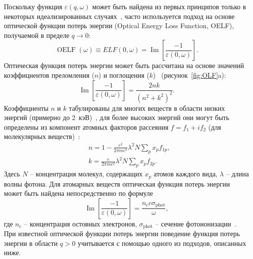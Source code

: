 Поскольку функция $\varepsilon(q, \omega)$ может быть найдена из первых принципов только в некоторых идеализированных случаях~\cite{Ritchie_ELF}, часто используется подход на основе оптической функции потерь энергии (Optical Energy Loss Function, OELF), получаемой в пределе $q \rightarrow 0$:
\begin{equation}
	\operatorname{OELF}(\omega) \equiv E L F(0, \omega)=\operatorname{Im}\left[\frac{-1}{\varepsilon(0, \omega)}\right].
\end{equation}
Оптическая функция потерь энергии может быть рассчитана на основе значений коэффициентов преломления ($n$) и поглощения ($k$)~\cite{Dapor_2015_oscillators} (рисунок~\ref{fig:OLF}a):
\begin{equation}
	\operatorname{Im}\left[\frac{-1}{\varepsilon(0, \omega)}\right]=\frac{2 n k}{\left(n^2+k^2\right)^2}.
\end{equation}
Коэффициенты $n$ и $k$ табулированы для многих веществ в области низких энергий (примерно до 2~кэВ)~\cite{Palik}, для более высоких энергий они могут быть определены из компонент атомных факторов рассеяния $f = f_1 + i f_2$ (для молекулярных веществ)~\cite{Henke_photoabs}:
\begin{equation}
	\begin{aligned}
		&n=1-\frac{e^2}{2 \pi m c^2} \lambda^2 N \sum_p x_p f_{1 p}, \\
		&k=\frac{e}{2 \pi m c^2} \lambda^2 N \sum_p x_p f_{2 p}.
	\end{aligned}
\end{equation}
Здесь $N$ -- концентрация молекул, содержащих $x_p$ атомов каждого вида, $\lambda$ -- длина волны фотона. Для атомарных веществ оптическая функция потерь энергии может быть найдена непосредственно по формуле
\begin{equation}
	\operatorname{Im}\left[\frac{-1}{\varepsilon(0, \omega)}\right]=\frac{n_\mathrm{c} c \sigma_\mathrm{phot}}{\omega},
\end{equation}
где $n_\mathrm{c}$ -- концентрация остовных электронов, $\sigma_\mathrm{phot}$ --  сечение фотоионизации~\cite{Biggs_cs}. При известной оптической функции потерь энергии поведение функция потерь энергии в области $q > 0$ учитывается с помощью одного из подходов, описанных ниже.


